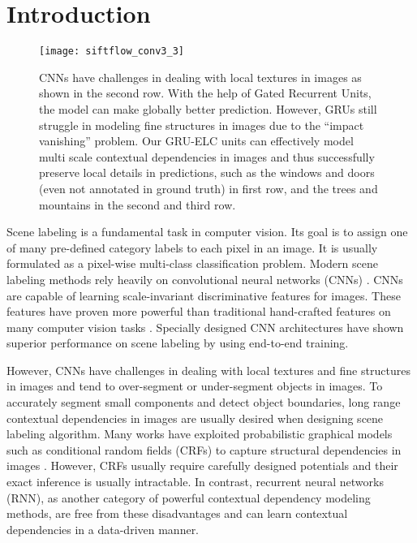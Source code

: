 \documentclass[10pt,twocolumn,letterpaper]{article}
\begin{document}
\section{Introduction}

\begin{figure}
\begin{center}
   \texttt{[image: siftflow\_conv3\_3]}
\end{center}
   \caption{CNNs have challenges in dealing with local textures in images as shown in the second row. With the help of Gated Recurrent Units, the model can make globally better prediction. However, GRUs still struggle in modeling fine structures in images due to the ``impact vanishing'' problem. Our GRU-ELC units can effectively model multi scale contextual dependencies in images and thus successfully preserve local details in predictions, such as the windows and doors (even not annotated in ground truth) in first row, and the trees and mountains in the second and third row.}
\label{fig:siftflow_short}
\end{figure}



Scene labeling is a fundamental task in computer vision. Its goal is to assign one of many pre-defined category labels to each pixel in an image. It is usually formulated as a pixel-wise multi-class classification problem. Modern scene labeling methods rely heavily on convolutional neural networks (CNNs) \cite{2,3,8,9}. CNNs are capable of learning scale-invariant discriminative features for images. These features have proven more powerful than traditional hand-crafted features on many computer vision tasks \cite{43,44,3}. Specially designed CNN architectures \cite{2,3,5,6,8} have shown superior performance on scene labeling by using end-to-end training. 

However, CNNs have challenges in dealing with local textures and fine structures in images and tend to over-segment or under-segment objects in images. To accurately segment small components and detect object boundaries, long range contextual dependencies in images are usually desired when designing scene labeling algorithm. 
Many works have exploited probabilistic graphical models such as conditional random fields (CRFs) \cite{22} to capture structural dependencies in images \cite{8,9}. However, CRFs usually require carefully designed potentials and their exact inference is usually intractable. In contrast, recurrent neural networks (RNN), as another category of powerful contextual dependency modeling methods, are free from these disadvantages and can learn contextual dependencies in a data-driven manner.
\end{document}
